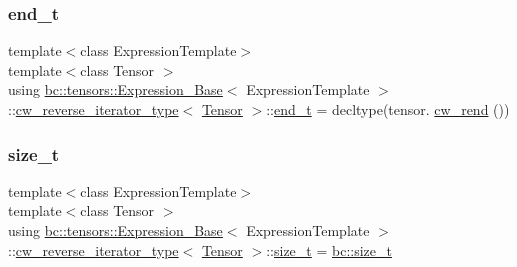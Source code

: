 \mbox{\label{structbc_1_1tensors_1_1Expression__Base_1_1cw__reverse__iterator__type_aff1a4ff5ef38cc11c629243ef23d6155}} 
\subsubsection{\texorpdfstring{end\+\_\+t}{end\_t}}
{\footnotesize\ttfamily template$<$class Expression\+Template$>$ \\
template$<$class Tensor $>$ \\
using \hyperlink{classbc_1_1tensors_1_1Expression__Base}{bc\+::tensors\+::\+Expression\+\_\+\+Base}$<$ Expression\+Template $>$\+::\hyperlink{structbc_1_1tensors_1_1Expression__Base_1_1cw__reverse__iterator__type}{cw\+\_\+reverse\+\_\+iterator\+\_\+type}$<$ \hyperlink{namespacebc_a659391e47ab612be3ba6c18cf9c89159}{Tensor} $>$\+::\hyperlink{structbc_1_1tensors_1_1Expression__Base_1_1cw__reverse__iterator__type_aff1a4ff5ef38cc11c629243ef23d6155}{end\+\_\+t} =  decltype(tensor. \hyperlink{classbc_1_1tensors_1_1Expression__Base_acd8f45445f2245cf879680274cc89d7f}{cw\+\_\+rend} ())}

\mbox{\label{structbc_1_1tensors_1_1Expression__Base_1_1cw__reverse__iterator__type_a0d2537ccece5626aeb1feef58980f3b6}} 
\subsubsection{\texorpdfstring{size\+\_\+t}{size\_t}}
{\footnotesize\ttfamily template$<$class Expression\+Template$>$ \\
template$<$class Tensor $>$ \\
using \hyperlink{classbc_1_1tensors_1_1Expression__Base}{bc\+::tensors\+::\+Expression\+\_\+\+Base}$<$ Expression\+Template $>$\+::\hyperlink{structbc_1_1tensors_1_1Expression__Base_1_1cw__reverse__iterator__type}{cw\+\_\+reverse\+\_\+iterator\+\_\+type}$<$ \hyperlink{namespacebc_a659391e47ab612be3ba6c18cf9c89159}{Tensor} $>$\+::\hyperlink{structbc_1_1tensors_1_1Expression__Base_1_1cw__reverse__iterator__type_a0d2537ccece5626aeb1feef58980f3b6}{size\+\_\+t} =  \hyperlink{namespacebc_aaf8e3fbf99b04b1b57c4f80c6f55d3c5}{bc\+::size\+\_\+t}}



